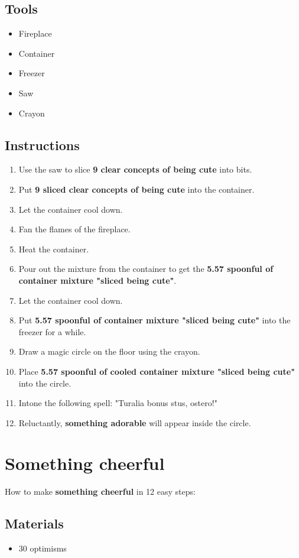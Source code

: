\documentclass{article}
\begin{document}
\subsection{Tools}\begin{itemize}
\item 
Fireplace
\item 
Container
\item 
Freezer
\item 
Saw
\item 
Crayon
\end{itemize}
\subsection{Instructions}\begin{enumerate}
\item 
Use the saw to slice \textbf{9 clear concepts of being cute} into bits.
\item 
Put \textbf{9 sliced clear concepts of being cute} into the container.
\item 
Let the container cool down.
\item 
Fan the flames of the fireplace.
\item 
Heat the container.
\item 
Pour out the mixture from the container to get the \textbf{5.57 spoonful of container mixture "sliced being cute"}.
\item 
Let the container cool down.
\item 
Put \textbf{5.57 spoonful of container mixture "sliced being cute"} into the freezer for a while.
\item 
Draw a magic circle on the floor using the crayon.
\item 
Place \textbf{5.57 spoonful of cooled container mixture "sliced being cute"} into the circle.
\item 
Intone the following spell: "Turalia bonus stus, ostero!"
\item 
Reluctantly, \textbf{something adorable} will appear inside the circle.
\end{enumerate}
\newpage
\section{Something cheerful}How to make \textbf{something cheerful} in 12 easy steps:

\subsection{Materials}\begin{itemize}
\item 
30 optimisms
\end{itemize}
\end{document}
